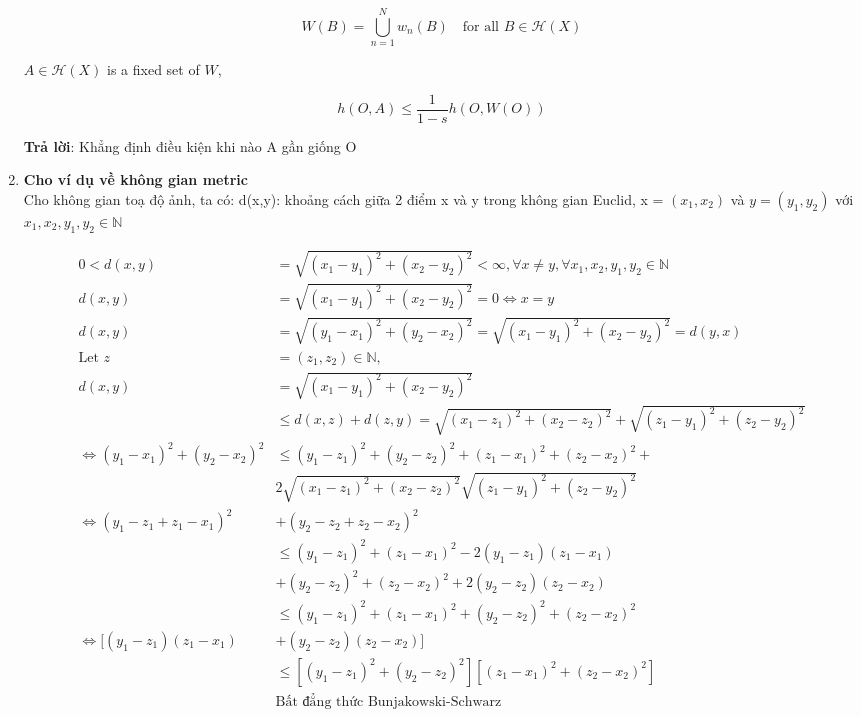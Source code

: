 \begin{enumerate}
    \[
    W(B) = \bigcup_{n=1}^N w_n(B) \quad \text{for all } B \in \mathcal{H}(X)
    \]
    
    \(A \in \mathcal{H}(X)\) is a fixed set of \(W\),
    
    \[
    h(O, A) \leq \frac{1}{1 - s} h(O, W(O))
    \]
    
    \textbf{Trả lời}: Khẳng định điều kiện khi nào A gần giống O
    \item \textbf{Cho ví dụ về không gian metric}\\
    Cho không gian toạ độ ảnh, ta có: d(x,y): khoảng cách giữa 2 điểm x và y trong không gian Euclid, x = $(x_1, x_2)$ và $y = (y_1, y_2)$ với $x_1, x_2, y_1, y_2 \in \mathbb{N}$
    
    \begin{align*}
        0 < d(x,y) &= \sqrt{(x_1 - y_1)^2 + (x_2 - y_2)^2} < \infty, \forall x \neq y, \forall x_1, x_2, y_1, y_2 \in \mathbb{N}\\
        d(x,y) &= \sqrt{(x_1 - y_1)^2 + (x_2 - y_2)^2} = 0 \Leftrightarrow x = y\\
        d(x,y) &= \sqrt{(y_1 - x_1)^2 + (y_2 - x_2)^2} = \sqrt{(x_1 - y_1)^2 + (x_2 - y_2)^2} = d(y,x)\\
        \text{Let }z &= (z_1, z_2) \in \mathbb{N},\\
        d(x,y) &= \sqrt{(x_1 - y_1)^2 + (x_2 - y_2)^2} \\
        &\leq d(x,z) + d(z,y) = \sqrt{(x_1 - z_1)^2 + (x_2 - z_2)^2} + \sqrt{(z_1 - y_1)^2 + (z_2 - y_2)^2}\\
        \Leftrightarrow (y_1 - x_1)^2 + (y_2 - x_2)^2 &\leq (y_1 - z_1)^2 + (y_2 - z_2)^2 + (z_1 - x_1)^2 + (z_2 - x_2)^2 +\\ 
        &2\sqrt{(x_1 - z_1)^2 + (x_2 - z_2)^2}\sqrt{(z_1 - y_1)^2 + (z_2 - y_2)^2}\\
        \Leftrightarrow (y_1 - z_1 + z_1 - x_1)^2 &+ (y_2 - z_2 + z_2 - x_2)^2 \\
        &\leq (y_1 - z_1)^2 + (z_1 - x_1)^2 - 2(y_1 - z_1)(z_1 - x_1) \\
        &+ (y_2 - z_2)^2 + (z_2 - x_2)^2 + 2(y_2 - z_2)(z_2 - x_2) \\
        &\leq (y_1 - z_1)^2 + (z_1 - x_1)^2 + (y_2 - z_2)^2 + (z_2 - x_2)^2\\
        \Leftrightarrow [(y_1 - z_1)(z_1 - x_1) &+ (y_2 - z_2)(z_2 - x_2)] \\
        &\leq [(y_1 - z_1)^2 +(y_2 - z_2)^2] [(z_1 - x_1)^2 + (z_2 - x_2)^2]\\
        &\text{Bất đẳng thức Bunjakowski-Schwarz}\\

\end{align*}
\end{enumerate}
